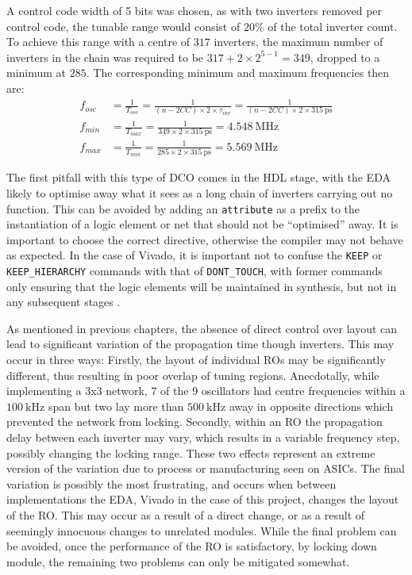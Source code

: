 A control code width of 5 bits was chosen, as with two inverters removed per control code, the tunable range would consist of $20\%$ of the total inverter count. To achieve this range with a centre of $317$ inverters, the maximum number of inverters in the chain was required to be $317+2\times 2^{5-1} = 349$, dropped to a minimum at $285$. The corresponding minimum and maximum frequencies then are:
\begin{align}
f_{osc} &= \frac{1}{T_{osc}} = \frac{1}{(n-2CC)\times 2\times\tau_{inv}} = \frac{1}{(n-2CC)\times 2\times 315~\si{\pico\second}} \\
f_{min} &= \frac{1}{T_{max}} = \frac{1}{349\times 2\times 315~\si{\pico\second}} = 4.548~\si{\mega\hertz} \\
f_{max} &= \frac{1}{T_{min}} = \frac{1}{285\times 2\times 315~\si{\pico\second}} = 5.569~\si{\mega\hertz}
\end{align}

The first pitfall with this type of \ac{DCO} comes in the \ac{HDL} stage, with the \ac{EDA} likely to optimise away what it sees as a long chain of inverters carrying out no function. This can be avoided by adding an \texttt{attribute} as a prefix to the instantiation of a logic element or net that should not be ``optimised'' away. It is important to choose the correct directive, otherwise the compiler may not behave as expected. In the case of Vivado, it is important not to confuse the \texttt{KEEP} or \texttt{KEEP\_HIERARCHY} commands with that of \texttt{DONT\_TOUCH}, with former commands only ensuring that the logic elements will be maintained in synthesis, but not in any subsequent stages \cite{synth_ug}.

As mentioned in previous chapters, the absence of direct control over layout can lead to significant variation of the propagation time though inverters. This may occur in three ways: Firstly, the layout of individual \ac{RO}s may be significantly different, thus resulting in poor overlap of tuning regions. Anecdotally, while implementing a 3x3 network, 7 of the 9 oscillators had centre frequencies within a $100~\si{\kilo\hertz}$ span but two lay more than $500~\si{\kilo\hertz}$ away in opposite directions which prevented the network from locking. Secondly, within an \ac{RO} the propagation delay between each inverter may vary, which results in a variable frequency step, possibly changing the locking range. These two effects represent an extreme version of the variation due to process or manufacturing seen on \ac{ASIC}s. The final variation is possibly the most frustrating, and occurs when between implementations the \ac{EDA}, Vivado in the case of this project, changes the layout of the \ac{RO}. This may occur as a result of a direct change, or as a result of seemingly innocuous changes to unrelated modules. While the final problem can be avoided, once the performance of the \ac{RO} is satisfactory, by locking down module, the remaining two problems can only be mitigated somewhat.

